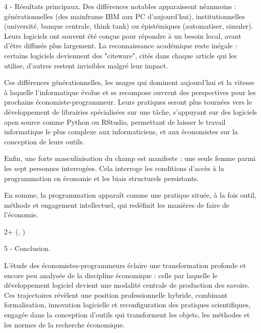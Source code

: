 \documentclass{beamer}
\newlength{\blockFour}
\begin{document}
\begin{frame}[t]
\begin{textblock*}{\colwidth}
\begin{alertblock}{4 - Résultats principaux.}
	Des différences notables apparaissent néanmoins : générationnelles (des mainframe IBM aux PC d'aujourd'hui), institutionnelles (université, banque centrale, think tank) ou épistémiques (automatiser, simuler). Leurs logiciels ont souvent été conçus pour répondre à un besoin local, avant d’être diffusés plus largement. La reconnaissance académique reste inégale : certains logiciels deviennent des "citeware", cités dans chaque article qui les utilise, d’autres restent invisibles malgré leur impact.

	Ces différences générationnelles, les usages qui dominent aujourd'hui et la vitesse à laquelle l'informatique évolue et se recompose ouvrent des perspectives pour les prochains économiste-programmeur. Leurs pratiques seront plus tournées vers le développement de librairies spécialisées sur une tâche, s'appuyant sur des logiciels open source comme Python ou RStudio, permettant de laisser le travail informatique le plus complexe aux informaticiens, et aux économistes sur la conception de leurs outils.
	
	Enfin, une forte masculinisation du champ est manifeste : une seule femme parmi les sept personnes interrogées. Cela interroge les conditions d’accès à la programmation en économie et les biais structurels persistants.
	
	En somme, la programmation apparaît comme une pratique située, à la fois outil, méthode et engagement intellectuel, qui redéfinit les manières de faire de l’économie.

	\vspace{0.25cm}
	\end{alertblock}

\end{textblock*}





\begin{textblock*}{2\colwidth + \colsep}(\leftmargin, \blockFour)

	\begin{alertblock}{5 - Conclusion.}
	\RaggedRight
	\vspace{0.25cm}

	L’étude des économistes-programmeurs éclaire une transformation profonde et encore peu analysée de la discipline économique : celle par laquelle le développement logiciel devient une modalité centrale de production des savoirs. Ces trajectoires révèlent une position professionnelle hybride, combinant formalisation, innovation logicielle et reconfiguration des pratiques scientifiques, engagée dans la conception d’outils qui transforment les objets, les méthodes et les normes de la recherche économique.


\end{alertblock}
\end{textblock*}
\end{frame}
\end{document}
